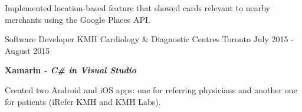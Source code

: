 \begin{cventries}
{\begin{cvitems}
        \item {Implemented location-based feature that showed cards relevant to nearby merchants using the Google Places API.}
      \end{cvitems}
    }
  \cventry
    {Software Developer}
    {KMH Cardiology \& Diagnostic Centres}
    {Toronto}
    {July 2015 - August 2015}
    {
      \begin{cvitems}
        \item[]{\textbf {Xamarin} \textit{\textbf { - C\# in Visual Studio}}}
        \item{Created two Android and iOS apps: one for referring physicians and another one for patients (iRefer KMH and KMH Labs).}
      \end{cvitems}
    }
\end{cventries}
